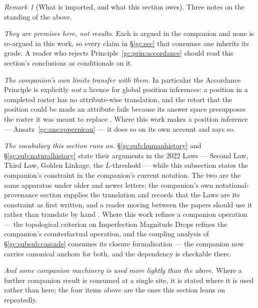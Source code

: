 \documentclass[11pt]{article}
\numberwithin{equation}{section}
\theoremstyle{plain}
\theoremstyle{definition}
\theoremstyle{remark}
\newtheorem{remark}[theorem]{Remark}
\begin{document}
\begin{remark}[What is imported, and what this section owes]
\label{gc:rem:importscope}
Three notes on the standing of the above.

\emph{They are premises here, not results.} Each is argued in the
companion and none is re-argued in this work, so every claim in
\S\ref{gc:sec} that consumes one inherits its grade. A reader who
rejects Principle~\ref{gc:prin:accordance} should read this section's
conclusions as conditionals on it.

\emph{The companion's own limits transfer with them.} In particular the
Accordance Principle is explicitly \emph{not} a licence for global
position inferences: a position in a completed roster has no
attribute-wise translation, and the retort that the position could be
made an attribute fails because its answer space presupposes the roster
it was meant to replace \cite{NexicFoundation}. Where this work makes a
position inference --- Ansatz~\ref{gc:ans:copernican} --- it does so on
its own account and says so.

\emph{The vocabulary this section runs on.} \S\ref{gc:sub:humanhistory}
and \S\ref{gc:sub:naturalhistory} state their arguments in the 2022 Laws
--- Second Law, Third Law, Golden Linkage, the $L$-threshold --- while
this subsection states the companion's constraint in the companion's
current notation. The two are the same apparatus under older and newer
letters; the companion's own notational-provenance section supplies the
translation and records that the Laws are its constraint as first
written, and a reader moving between the papers should use it rather than
translate by hand \cite{Nexus}. Where this work refines a companion
operation --- the topological criterion on Imperfection Magnitude Drops
refines the companion's counterfactual operation, and the coupling
analysis of \S\ref{gc:subsub:cascade} consumes its closure formalisation
--- the companion now carries canonical anchors for both, and the
dependency is checkable there.

\emph{And some companion machinery is used more lightly than the above.}
Where a further companion result is consumed at a single site, it is
stated where it is used rather than here; the four items above are the
ones this section leans on repeatedly.
\end{remark}
\end{document}
